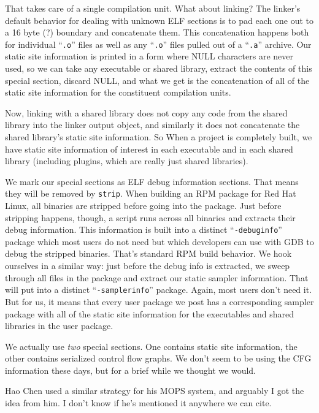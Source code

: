 \documentclass[times,10pt,twocolumn]{article}
\begin{document}
That takes care of a single compilation unit.  What about linking?
The linker's default behavior for dealing with unknown ELF sections is
to pad each one out to a 16 byte (?) boundary and concatenate them.
This concatenation happens both for individual ``\texttt{.o}'' files
as well as any ``\texttt{.o}'' files pulled out of a ``\texttt{.a}''
archive.  Our static site information is printed in a form where NULL
characters are never used, so we can take any executable or shared
library, extract the contents of this special section, discard NULL,
and what we get is the concatenation of all of the static site
information for the constituent compilation units.

Now, linking with a shared library does not copy any code from the
shared library into the linker output object, and similarly it does
not concatenate the shared library's static site information.  So When
a project is completely built, we have static site information of
interest in each executable and in each shared library (including
plugins, which are really just shared libraries).

We mark our special sections as ELF debug information sections.  That
means they will be removed by \texttt{strip}.  When building an RPM
package for Red Hat Linux, all binaries are stripped before going into
the package.  Just before stripping happens, though, a script runs
across all binaries and extracts their debug information.  This
information is built into a distinct ``\texttt{-debuginfo}'' package
which most users do not need but which developers can use with GDB to
debug the stripped binaries.  That's standard RPM build behavior.  We
hook ourselves in a similar way: just before the debug info is
extracted, we sweep through all files in the package and extract our
static sampler information.  That will put into a distinct
``\texttt{-samplerinfo}'' package.  Again, most users don't need it.
But for us, it means that every user package we post has a
corresponding sampler package with all of the static site information
for the executables and shared libraries in the user package.

We actually use \emph{two} special sections.  One contains static site
information, the other contains serialized control flow graphs.  We
don't seem to be using the CFG information these days, but for a brief
while we thought we would.

Hao Chen used a similar strategy for his MOPS system, and arguably I
got the idea from him.  I don't know if he's mentioned it anywhere we
can cite.
\end{document}
